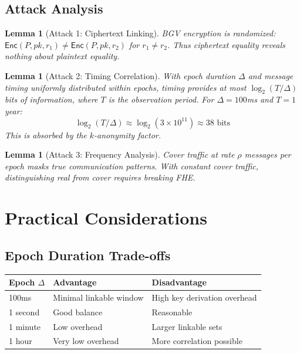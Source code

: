\documentclass[11pt]{article}
\newtheorem{lemma}[theorem]{Lemma}
\newcommand{\Enc}{\mathsf{Enc}}
\begin{document}
\subsection{Attack Analysis}

\begin{lemma}[Attack 1: Ciphertext Linking]
BGV encryption is randomized: $\Enc(P, pk, r_1) \neq \Enc(P, pk, r_2)$ for $r_1 \neq r_2$.
Thus ciphertext equality reveals nothing about plaintext equality.
\end{lemma}

\begin{lemma}[Attack 2: Timing Correlation]
With epoch duration $\Delta$ and message timing uniformly distributed within epochs,
timing provides at most $\log_2(T/\Delta)$ bits of information, where $T$ is the
observation period. For $\Delta = 100$ms and $T = 1$ year:
\[
\log_2(T/\Delta) \approx \log_2(3 \times 10^{11}) \approx 38 \text{ bits}
\]
This is absorbed by the $k$-anonymity factor.
\end{lemma}

\begin{lemma}[Attack 3: Frequency Analysis]
Cover traffic at rate $\rho$ messages per epoch masks true communication patterns.
With constant cover traffic, distinguishing real from cover requires breaking FHE.
\end{lemma}

\section{Practical Considerations}

\subsection{Epoch Duration Trade-offs}

\begin{center}
\begin{tabular}{|l|l|l|}
\hline
\textbf{Epoch $\Delta$} & \textbf{Advantage} & \textbf{Disadvantage} \\
\hline
100ms & Minimal linkable window & High key derivation overhead \\
1 second & Good balance & Reasonable \\
1 minute & Low overhead & Larger linkable sets \\
1 hour & Very low overhead & More correlation possible \\
\hline
\end{tabular}
\end{center}
\end{document}
